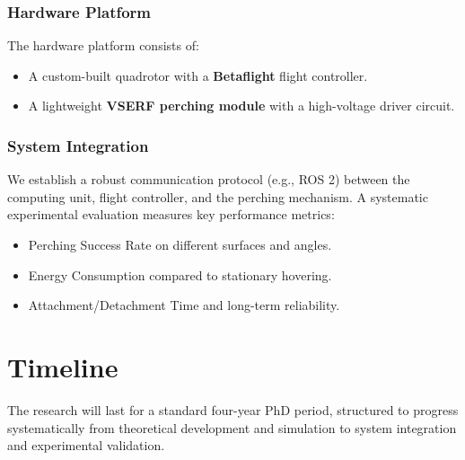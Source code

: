 \documentclass[11pt,a4paper]{article}
\begin{document}
\subsubsection{Hardware Platform}
The hardware platform consists of:
\begin{itemize}
    \item A custom-built quadrotor with a \textbf{Betaflight} flight controller.
    \item A lightweight \textbf{VSERF perching module} with a high-voltage driver circuit.
\end{itemize}

\subsubsection{System Integration}
We establish a robust communication protocol (e.g., ROS 2) between the computing unit, flight controller, and the perching mechanism. A systematic experimental evaluation measures key performance metrics:
\begin{itemize}
    \item Perching Success Rate on different surfaces and angles.
    \item Energy Consumption compared to stationary hovering.
    \item Attachment/Detachment Time and long-term reliability.
\end{itemize}

\section{Timeline}
The research will last for a standard four-year PhD period, structured to progress systematically from theoretical development and simulation to system integration and experimental validation.
\end{document}

